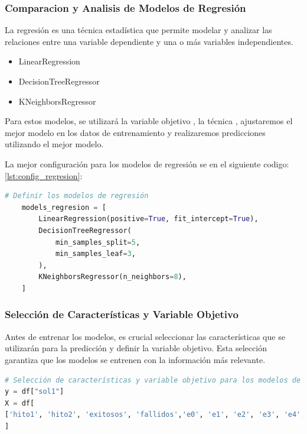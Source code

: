 \subsubsection{Comparacion y Analisis de Modelos de Regresión}

La regresión es una técnica estadística que permite modelar y analizar las relaciones entre una variable dependiente y una o más variables independientes.

\begin{itemize}
    \item LinearRegression
    \item DecisionTreeRegressor
    \item KNeighborsRegressor
\end{itemize}

Para estos modelos, se utilizará la variable objetivo , la técnica , ajustaremos el mejor modelo en los datos de entrenamiento y realizaremos predicciones utilizando el mejor modelo.

La mejor configuración para los modelos de regresión se en el siguiente codigo: \ref{lst:config_regresion}:

\begin{lstlisting}[language=Python, caption=Configuración de los modelos de regresión, label=lst:config_regresion]
    # Definir los modelos de regresión
    models_regresion = [
        LinearRegression(positive=True, fit_intercept=True),
        DecisionTreeRegressor(
            min_samples_split=5,
            min_samples_leaf=3,
        ),
        KNeighborsRegressor(n_neighbors=8),
    ]
    \end{lstlisting}


\subsubsection{Selección de Características y Variable Objetivo}
Antes de entrenar los modelos, es crucial seleccionar las características que se utilizarán para la predicción y definir la variable objetivo. Esta selección garantiza que los modelos se entrenen con la información más relevante.

\begin{lstlisting}[language=Python, caption=Seleccion de caracteristica y variable objetivo, label=lst:config_varObjetivoCaracteristicas]
# Selección de características y variable objetivo para los modelos de Regresion.
y = df["sol1"]
X = df[
['hito1', 'hito2', 'exitosos', 'fallidos','e0', 'e1', 'e2', 'e3', 'e4', 'e5', 'e6', 'e7', 'e8', 'e9', 'e10', 'e11', 'e12', 'e13', 'e14', 'e15', 'e16', 'e17', 'e18', 'e19', 'e20', 'e21', 'e22', 'e23', 'e24', 'e25', 'e26', 'e27', 'e28', 'e29', 'e30', 'e31', 'e32', 'e33', 'e34', 'e35', 'e36', 'e37', 'e38', 'e39', 'e40', 'e41', 'e42', 'e43', 'e44', 'e45', 'e46', 'e47', 'e48', 'e49', 'e50', 'e51', 'e52']
]
\end{lstlisting}


